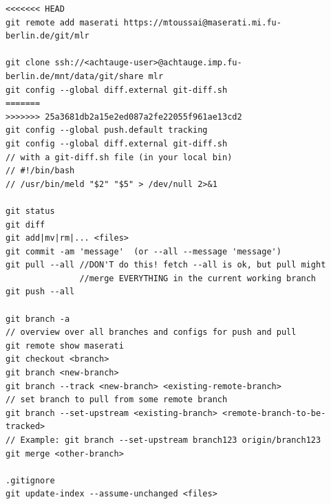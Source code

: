 \begin{code}
\begin{verbatim}
<<<<<<< HEAD
git remote add maserati https://mtoussai@maserati.mi.fu-berlin.de/git/mlr

git clone ssh://<achtauge-user>@achtauge.imp.fu-berlin.de/mnt/data/git/share mlr
git config --global diff.external git-diff.sh
=======
>>>>>>> 25a3681db2a15e2ed087a2fe22055f961ae13cd2
git config --global push.default tracking
git config --global diff.external git-diff.sh
// with a git-diff.sh file (in your local bin)
// #!/bin/bash
// /usr/bin/meld "$2" "$5" > /dev/null 2>&1

git status
git diff
git add|mv|rm|... <files>
git commit -am 'message'  (or --all --message 'message')
git pull --all //DON'T do this! fetch --all is ok, but pull might
               //merge EVERYTHING in the current working branch
git push --all

git branch -a
// overview over all branches and configs for push and pull
git remote show maserati
git checkout <branch>
git branch <new-branch>
git branch --track <new-branch> <existing-remote-branch>
// set branch to pull from some remote branch
git branch --set-upstream <existing-branch> <remote-branch-to-be-tracked>
// Example: git branch --set-upstream branch123 origin/branch123
git merge <other-branch>

.gitignore
git update-index --assume-unchanged <files>
\end{verbatim}
\end{code}


